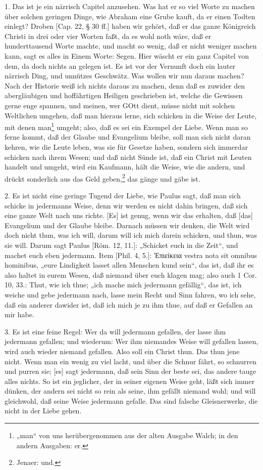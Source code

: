 1. Das ist je ein närrisch Capitel anzusehen. Was hat er so viel Worte zu machen über solchen geringen Dinge, wie Abraham eine Grube kauft, da er einen Todten einlegt? Droben [Cap. 22, § 30 ff.] haben wir gehört, daß er das ganze Königreich Christi in drei oder vier Worten faßt, da es wohl noth wäre, daß er hunderttausend Worte machte, und macht so wenig, daß er nicht weniger machen kann, sagt es alles in Einem Worte: Segen. Hier wäscht er ein ganz Capitel von dem, da doch nichts an gelegen ist. Es ist vor der Vernunft doch ein lauter närrisch Ding, und unnützes Geschwätz. Was wollen wir nun daraus machen? Nach der Historie weiß ich nichts daraus zu machen, denn daß es zuwider den abergläubigen und hoffährtigen Heiligen geschrieben ist, welche die Gewissen gerne enge spannen, und meinen, wer GOtt dient, müsse nicht mit solchen Weltlichen umgehen, daß man hieraus lerne, sich schicken in die Weise der Leute, mit denen man\footnote{„man“ von uns herübergenommen aus der alten Ausgabe Walch; in den andern Ausgaben: er.} umgeht; also,
daß es sei ein Exempel der Liebe. Wenn man so ferne kommt, daß der Glaube und Evangelium bleibe, soll man sich nicht daran kehren, wie die Leute leben, was sie für Gesetze haben, sondern sich immerdar schicken nach ihrem Wesen; und daß nicht Sünde ist, daß ein Christ mit Leuten handelt und umgeht, wird ein Kaufmann, hält die Weise, wie die andern, und drückt sonderlich aus das Geld geben,\footnote{Jenaer: und.} das gänge und gäbe ist.

2. Es ist nicht eine geringe Tugend der Liebe, wie Paulus sagt, daß man sich schicke in jedermanns Weise, denn wir werden es nicht dahin bringen, daß sich eine ganze Welt nach uns richte. [Es] ist genug, wenn wir das erhalten, daß [das] Evangelium und der Glaube bleibe. Darnach müssen wir denken, die Welt wird doch nicht thun, was ich will, darum will ich mich darein schicken, und thun, was sie will. Darum sagt Paulus [Röm. 12, 11.]: „Schicket euch in die Zeit“, und machet euch eben jedermann. Item [Phil. 4, 5.]: Ἐπιείκεια vestra nota sit omnibus hominibus, „eure Lindigkeit lasset allen Menschen kund sein“, das ist, daß ihr es also haltet in eurem Wesen, daß niemand über euch klagen mag; also auch 1 Cor. 10, 33.: Thut, wie ich thue; „ich mache mich jedermann gefällig“, das ist, ich weiche und gebe jedermann nach, lasse mein Recht und Sinn fahren, wo ich sehe, daß ein anderer dawider ist, daß ich mich je zu ihm thue, auf daß er Gefallen an mir habe.

3. Es ist eine feine Regel: Wer da will jedermann gefallen, der lasse ihm jedermann gefallen; und wiederum: Wer ihm niemandes Weise will gefallen lassen, wird auch wieder niemand gefallen. Also soll ein Christ thun. Das thun jene nicht. Wenn man ein wenig zu viel lacht, und über die Schnur fährt, so schnurren und purren sie; [es] sagt jedermann, daß sein Sinn der beste sei, das andere tauge alles nichts. So ist ein jeglicher, der in seiner eigenen Weise geht, läßt sich immer dünken, der andern sei nicht so rein als seine, ihm gefällt niemand wohl; und will gleichwohl, daß seine Weise jedermann gefalle. Das sind falsche Gleisnerwerke, die nicht in der Liebe gehen.

